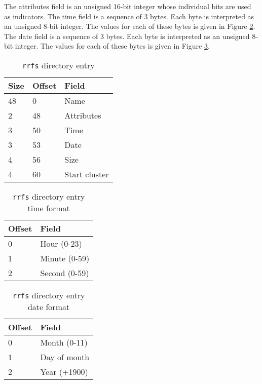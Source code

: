 The attributes field is an unsigned 16-bit integer whose
individual bits are used as indicators.  The time field
is a sequence of 3 bytes.  Each byte is interpreted as
an unsigned 8-bit integer.  The values for each of these
bytes is given in Figure \ref{rrfsdetime}.  The date
field is a sequence of 3 bytes.  Each byte is interpreted
as an unsigned 8-bit integer.  The values for each of
these bytes is given in Figure \ref{rrfsdedate}.

\begin{table}[t] \begin{center}
\begin{tabular}{|l|l|l|} \hline
Size & Offset & Field \\ \hline \hline
48 & 0 & Name \\ \hline
2 & 48 & Attributes \\ \hline
3 & 50 & Time \\ \hline
3 & 53 & Date \\ \hline
4 & 56 & Size \\ \hline
4 & 60 & Start cluster \\ \hline
\end{tabular}
\caption{\label{rrfsde} {\tt rrfs} directory entry}
\end{center} \end{table}

\begin{table}[t] \begin{center}
\begin{tabular}{|l|l|} \hline
Offset & Field \\ \hline \hline
0 & Hour (0-23) \\ \hline
1 & Minute (0-59) \\ \hline
2 & Second (0-59) \\ \hline
\end{tabular}
\caption{\label{rrfsdetime} {\tt rrfs} directory entry time format}
\end{center} \end{table}

\begin{table}[t] \begin{center}
\begin{tabular}{|l|l|} \hline
Offset & Field \\ \hline \hline
0 & Month (0-11) \\ \hline
1 & Day of month \\ \hline
2 & Year (+1900) \\ \hline
\end{tabular}
\caption{\label{rrfsdedate} {\tt rrfs} directory entry date format}
\end{center} \end{table}
